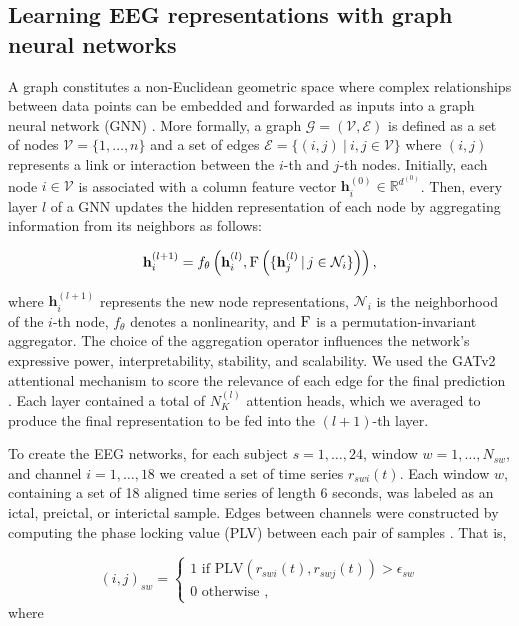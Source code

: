 \documentclass[a4paper,fleqn]{cas-sc}
\begin{document}
\subsection{Learning EEG representations with graph neural networks}
\color{black} %
A graph constitutes a non-Euclidean geometric space where complex relationships between data points can be embedded and forwarded as inputs into a graph neural network (GNN) \cite{BronsteinGeometricDL}. More formally, a graph $\mathcal{G} = (\mathcal{V}, \mathcal{E})$ is defined as a set of nodes $\mathcal{V} = \{1, \ldots, n\}$ and a set of edges $\mathcal{E} = \{(i,j) \ | \  i,j \in \mathcal{V}\}$ where $(i,j)$ represents a link or interaction between the $i$-th and $j$-th nodes. Initially, each node $i \in \mathcal{V}$ is associated with a column feature vector $\mathbf{h}_{i}^{(0)} \in \mathbb{R}^{d^{(0)}}$. Then, every layer \( l \) of a GNN updates the hidden representation of each node by aggregating information from its neighbors as follows:

\begin{equation} \label{eq:layer}
    \mathbf{h}_{i}^{(l+1)} = f_{\theta} \left( \mathbf{h}_i^{(l)}, \textsc{F} \left( \{ \mathbf{h}^{(l)}_j \, | \, j \in \mathcal{N}_i \} \right) \right),
\end{equation}

where \( \mathbf{h}_{i}^{(l+1)} \) represents the new node representations, \( \mathcal{N}_i \) is the neighborhood of the \( i \)-th node, \( f_{\theta} \) denotes a nonlinearity, and \(\textsc{F}\) is a permutation-invariant aggregator. The choice of the aggregation operator influences the network's expressive power, interpretability, stability, and scalability. We used the GATv2 attentional mechanism to score the relevance of each edge for the final prediction \cite{brody2021gatv2}. Each layer contained a total of $N_K^{(l)}$ attention heads, which we averaged to produce the final representation to be fed into the $(l+1)$-th layer. 

To create the EEG networks, for each subject $s=1,\ldots,24$, window $w=1,\ldots,N_{sw}$, and channel $i=1,\ldots,18$ we created a set of time series $r_{swi}(t)$. Each window $w$, containing a set of 18 aligned time series of length 6 seconds, was labeled as an ictal, preictal, or interictal sample. Edges between channels were constructed by computing the phase locking value (PLV) between each pair of samples \cite{bruna2018plv}. That is,

\begin{equation}
    (i,j)_{sw} =  
    \begin{cases}
        1 \text{  if  PLV}(r_{swi}(t), r_{swj}(t)) > \epsilon_{sw} \\
        0 \text{  otherwise  },
    \end{cases}
    \label{edges}
\end{equation} where
\end{document}
